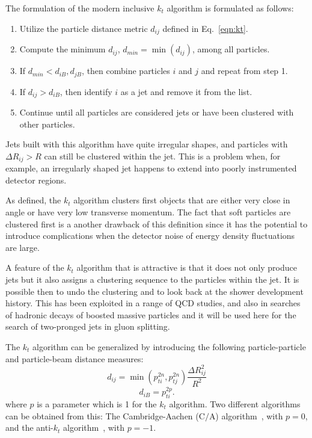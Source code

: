 The formulation of the modern inclusive $k_t$ algorithm is formulated as follows:

\begin{enumerate}\addtolength{\itemsep}{-0.4\baselineskip}
\item  
Utilize the particle distance metric $d_{ij}$ defined in Eq.~\ref{eqn:kt}.
\item
Compute the minimum $d_{ij}$, $d_{min} = \min(d_{ij})$, among all particles.
\item
If  $d_{min} < d_{iB},d_{jB}$, then combine particles $i$ and $j$ and repeat from step 1.
\item
If $d_{ij} > d_{iB}$, then identify $i$ as a jet and remove it from the list.
\item
Continue until all particles are considered jets or have been clustered with other particles.
\end{enumerate}

 Jets built with this algorithm have quite irregular shapes, and particles with $\Delta R_{ij} > R$ can still be clustered within the jet. This is a problem when, for example, an irregularly shaped jet happens to extend into poorly instrumented detector regions. 

As defined, the $k_t$ algorithm clusters first objects that are either very close in angle or have very low transverse momentum. The fact that soft particles are clustered first is a another drawback of this definition since it  has the potential to introduce complications when the detector noise of energy density fluctuations are large.

A feature of the $k_t$ algorithm that is attractive is that it does not only produce jets but it also assigns a clustering sequence to the particles within the jet. It is possible then to undo the clustering and to look %
back at the shower development history.  This has been exploited in a range of QCD studies, and also in searches of hadronic decays of boosted massive particles  and it will be used here for the search of two-pronged jets in gluon splitting.

The $k_t$ algorithm can be generalized by introducing the following particle-particle and particle-beam distance measures:
%
\begin{equation} 
d_{ij} = \min(p^{2n}_{ti},p^{2n}_{tj}) \frac{\Delta R^2_{ij}}{R^2}
 \label{eqn:generickt}
\end{equation}
%
\begin{equation}
d_{iB}=p^{2p}_{ti}. 
 \label{eqn:generickt2}
\end{equation}
%
where $p$ is a parameter which is 1 for the $k_t$ algorithm. Two different algorithms can be obtained from this: The Cambridge-Aachen (C$/$A) algorithm~\cite{CamAchem}, with $p=0$, and the anti-$k_t$ algorithm~\cite{antiktalg}, with $p=-1$. 

